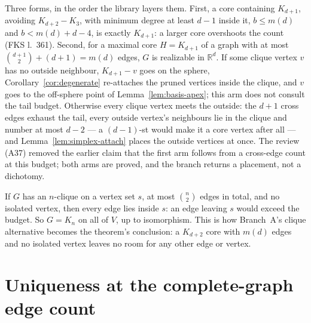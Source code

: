 \begin{lemma}[Branch B at $b = m(d)$: the clique core]
  \label{lem:eq-core-clique}
  \leanok
  Three forms, in the order the library layers them. First, a core containing $K_{d+1}$,
  avoiding $K_{d+2} - K_3$, with minimum degree at least $d - 1$ inside it,
  $b \le m(d)$ and $b < m(d) + d - 4$, is exactly $K_{d+1}$: a larger core overshoots the
  count (FKS l.~361). Second, for a maximal core $H = K_{d+1}$ of a graph with at most
  $\binom{d+1}{2} + (d + 1) = m(d)$ edges, $G$ is realizable in $\mathbb{R}^d$. If some
  clique vertex $v$ has no outside neighbour, $K_{d+1} - v$ goes on the sphere,
  Corollary~\ref{cor:degenerate} re-attaches the pruned vertices inside the clique, and $v$
  goes to the off-sphere point of Lemma~\ref{lem:basis-apex}; this arm does not consult the
  tail budget. Otherwise every clique vertex meets the outside: the $d + 1$ cross edges
  exhaust the tail, every outside vertex's neighbours lie in the clique and number at most
  $d - 2$ --- a $(d-1)$-st would make it a core vertex after all --- and
  Lemma~\ref{lem:simplex-attach} places the outside vertices at once. The review (A37)
  removed the earlier claim that the first arm follows from a cross-edge count at this
  budget; both arms are proved, and the branch returns a placement, not a dichotomy.
\end{lemma}

\begin{lemma}
  \label{lem:eq-clique-exhausts}
  \leanok
  If $G$ has an $n$-clique on a vertex set $s$, at most $\binom{n}{2}$ edges in total, and
  no isolated vertex, then every edge lies inside $s$: an edge leaving $s$ would exceed the
  budget. So $G = K_n$ on all of $V$, up to isomorphism. This is how
  Branch~A's clique alternative becomes the theorem's conclusion: a $K_{d+2}$ core with
  $m(d)$ edges and no isolated vertex leaves no room for any other edge or vertex.
\end{lemma}

\section{Uniqueness at the complete-graph edge count}

